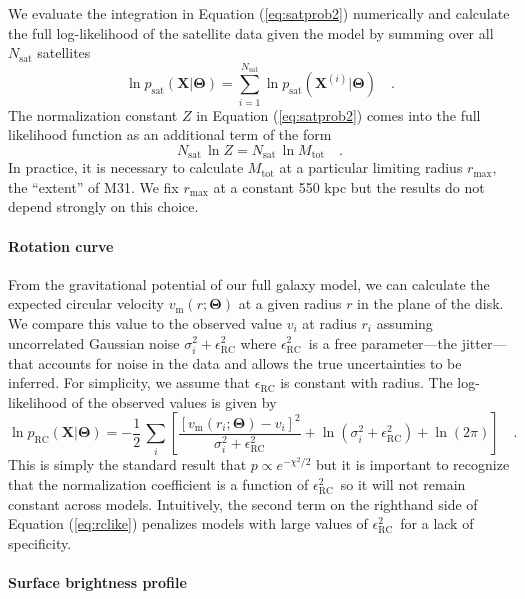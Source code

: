 \documentclass[preprint,12pt]{aastex}
\newcommand{\eqlabel}[1]{\label{eq:#1}}
\newcommand{\eq}[1]{Equation (\ref{eq:#1})}
\newcommand{\bvec}[1]{\ensuremath{\boldsymbol{#1}}}
\renewcommand{\vector}[1]{\ensuremath{\bvec{#1}}}
\newcommand{\model}{\vector{\Theta}}
\newcommand{\data}{\vector{X}}
\newcommand{\prob}{\ensuremath{p}}
\newcommand{\pr}{\prob}
\newcommand{\sat}{\mathrm{sat}}
\newcommand{\rc}{\mathrm{RC}}
\newcommand{\jitter}[1]{\ensuremath{\epsilon_\mathrm{#1}^2}}
\newcommand{\jitterrc}{\jitter{RC}}
\newcommand{\rcmodel}{\ensuremath{v_\mathrm{m}}}
\newcommand{\rcvar}{\ensuremath{\sigma_i^2 + \jitterrc}}
\newcommand{\rcobs}{\ensuremath{v_i}}
\begin{document}
We evaluate the integration in \eq{satprob2} numerically and calculate
the full log-likelihood of the satellite data given the model by summing
over all $N_\sat$ satellites
\begin{equation}\eqlabel{satlike}
    \ln \pr_\sat (\data | \model)
        = \sum_{i=1}^{N_\sat} \ln \pr_\sat (\data^{(i)} | \model) \quad.
\end{equation}
The normalization constant $Z$ in \eq{satprob2} comes into the full
likelihood function as an additional term of the form
\begin{equation}
    N_\sat \, \ln Z = N_\sat \, \ln M_\mathrm{tot} \quad .
\end{equation}
In practice, it is necessary to calculate $M_\mathrm{tot}$ at a particular
limiting radius $r_\mathrm{max}$, the ``extent'' of M31. We fix
$r_\mathrm{max}$ at a constant 550 kpc but the results do not depend
strongly on this choice.

\paragraph{Rotation curve}

From the gravitational potential of our full galaxy model, we can calculate
the expected circular velocity $\rcmodel (r; \model)$ at a given radius
$r$ in the plane of the disk. We compare this value to the observed value
$v_i$ at radius $r_i$ assuming uncorrelated Gaussian noise
$\rcvar$ where \jitterrc\
is a free parameter---the jitter---that accounts for noise in the data and
allows the true uncertainties to be inferred.  For simplicity, we assume that
$\epsilon_\mathrm{RC}$ is constant with radius.  The log-likelihood of the
observed values is given by
\begin{equation}
    \eqlabel{rclike}
    \ln \pr_\rc (\data | \model) = - \frac{1}{2} \, \sum_i
        \left [ \frac{[ \rcmodel (r_i; \model) - \rcobs]^2}{\rcvar}
            + \ln (\rcvar) + \ln (2 \pi) \right ] \quad .
\end{equation}
This is simply the standard result that $\pr \propto e^{-\chi^2/2}$ but it is
important to recognize that the normalization coefficient is a function of
\jitterrc\ so it will not remain constant across models.
Intuitively, the second term on the righthand side of \eq{rclike} penalizes
models with large values of \jitterrc\ for a lack of specificity.

\paragraph{Surface brightness profile}
\end{document}
